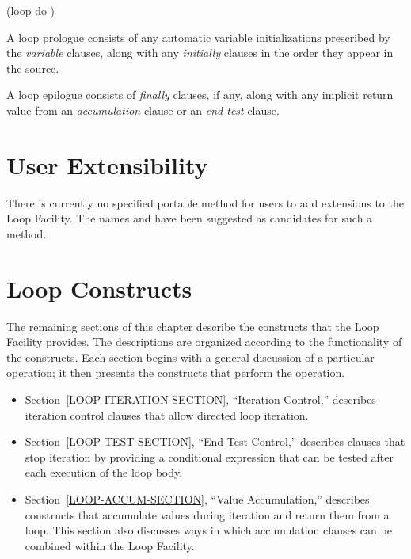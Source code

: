 \begin{new}
\begin{lisp}
(loop do )
\end{lisp}

  A loop prologue consists of any automatic variable initializations prescribed 
  by the {\it variable\/} clauses, along with any {\it initially\/} clauses
  in the order they appear in the source.

  A loop epilogue consists of {\it finally\/} clauses, if any, along
  with any implicit return value from an {\it accumulation\/} clause or
  an {\it end-test\/} clause.


  \section{User Extensibility}

  There is currently no specified portable method for users to add
  extensions to the Loop Facility.  The names  and
   have been suggested as candidates for such a method.



\section{Loop Constructs}

The remaining sections of this chapter describe the constructs that the Loop Facility
provides.  The descriptions are organized according to the functionality
of the constructs.  Each section begins with a general discussion of
a particular operation; it then presents the constructs that perform the 
operation.

\begin{itemize}

\item Section~\ref{LOOP-ITERATION-SECTION},
``Iteration Control,'' describes iteration
control clauses that allow directed loop iteration.  

\item Section~\ref{LOOP-TEST-SECTION}, ``End-Test Control,'' 
describes clauses that stop iteration by providing a conditional expression
that can be tested after each execution of the loop body.  

\item Section~\ref{LOOP-ACCUM-SECTION},
``Value Accumulation,'' describes constructs
that accumulate values during iteration and return them from a loop.  This section also
discusses ways in which accumulation clauses can be combined within the
Loop Facility.  


\end{itemize}
\end{new}
